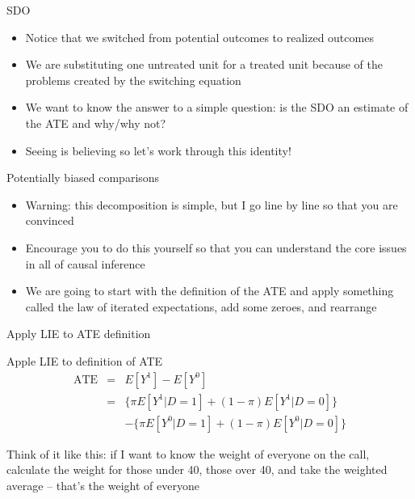 \documentclass{beamer}
\begin{document}
\begin{frame}{SDO}

  \begin{itemize}
    \item Notice that we switched from potential outcomes to realized outcomes
    \item We are substituting one untreated unit for a treated unit because of the problems created by the switching equation
    \item We want to know the answer to a simple question: is the SDO an estimate of the ATE and why/why not?
    \item   Seeing is believing so let's work through this identity!
  \end{itemize}

\end{frame}


\begin{frame}{Potentially biased comparisons}

\begin{itemize}
\item Warning: this decomposition is simple, but I go line by line so that you are convinced
\item Encourage you to do this yourself so that you can understand the core issues in all of causal inference
\item We are going to start with the definition of the ATE and apply something called the law of iterated expectations, add some zeroes, and rearrange
\end{itemize}

\end{frame}

\begin{frame}{Apply LIE to ATE definition}
  \begin{block}{Apple LIE to definition of ATE}
    \begin{eqnarray*}
      \text{ATE}&=&E[Y^1]-E[Y^0]  \\
      &=& \{\pi E[Y^1 | D=1] + (1-\pi)E[Y^1 | D=0]\}  \\
      & & - \{\pi E[Y^0|D=1] + (1-\pi) E[Y^0 | D=0]\}
    \end{eqnarray*}
  \end{block}
  
  \bigskip
  
  Think of it like this: if I want to know the weight of everyone on the call, calculate the weight for those under 40, those over 40, and take the weighted average -- that's the weight of everyone
  
  \end{frame}
\end{document}

